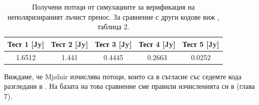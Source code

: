\begin{appendices}
\begin{table}[h!]
	\centering
	\begin{tabular}{c|c|c|c|c}
		\hline
		{Тест 1 [Jy]} & {Тест 2 [Jy]} & {Тест 3 [Jy]} & {Тест 4 [Jy]} & {Тест 5 [Jy]}
		\\\hline\hline
		1.6512 & 1.441 & 0.4445 & 0.2663 & 0.0252
		\\\hline\hline
	\end{tabular}
	\caption[Получени потоци от симулациите за верификация на неполяризираният лъчист пренос.]{\small Получени потоци от симулациите за верификация на неполяризираният лъчист пренос. За сравнение с други кодове виж \cite{Gold2020}, таблица 2.}
	\label{table:Sim_Verification_flux}
\end{table}
Виждаме, че Mjølnir изчислява потоци, които са в съгласие със седемте кода разгледани в \cite{Gold2020}. На базата на това сравнение сме правили изчисленията си в \cite{Deliyski2024} (глава 7).

\end{appendices}
